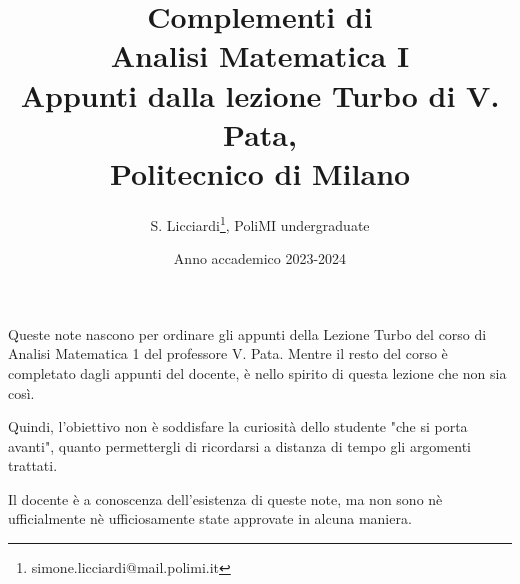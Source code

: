 \documentclass[a4paper,12pt]{report}
\author{S. Licciardi\thanks{simone.licciardi@mail.polimi.it}, PoliMI undergraduate}
\date{\large Anno accademico 2023-2024}
\title
{
	\large Complementi di\\
	\LARGE \textbf{Analisi Matematica I} \\[.4\baselineskip]
	\large Appunti dalla lezione Turbo di V. Pata, \\Politecnico di Milano
}
\begin{document}
\maketitle
\tableofcontents

\par\vspace{2cm}Queste note nascono per ordinare gli appunti della Lezione Turbo del corso di Analisi Matematica 1 del professore V. Pata. 
Mentre il resto del corso è completato dagli appunti del docente, è nello spirito di questa lezione che non sia così.

Quindi, l'obiettivo non è soddisfare la curiosità dello studente "che si porta avanti", quanto permettergli di ricordarsi a distanza di tempo gli argomenti trattati.

Il docente è a conoscenza dell'esistenza di queste note, ma non sono nè ufficialmente nè ufficiosamente state approvate in alcuna maniera.

\newpage






\end{document}
